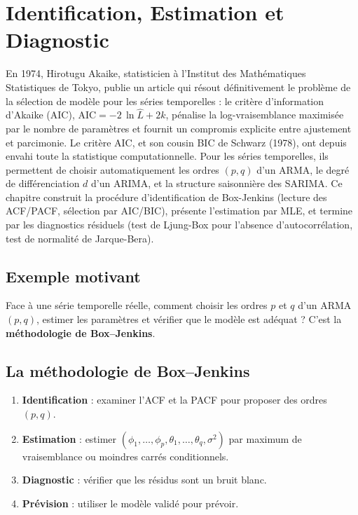 \chapter{Identification, Estimation et Diagnostic}
\label{ch:identification}

En 1974, Hirotugu Akaike, statisticien à l'Institut des Mathématiques Statistiques de Tokyo, publie un article qui résout définitivement le problème de la sélection de modèle pour les séries temporelles : le critère d'information d'Akaike (AIC), $\mathrm{AIC} = -2\,\ln\hat{L} + 2k$, pénalise la log-vraisemblance maximisée par le nombre de paramètres et fournit un compromis explicite entre ajustement et parcimonie. Le critère AIC, et son cousin BIC de Schwarz (1978), ont depuis envahi toute la statistique computationnelle. Pour les séries temporelles, ils permettent de choisir automatiquement les ordres $(p,q)$ d'un ARMA, le degré de différenciation $d$ d'un ARIMA, et la structure saisonnière des SARIMA. Ce chapitre construit la procédure d'identification de Box-Jenkins (lecture des ACF/PACF, sélection par AIC/BIC), présente l'estimation par MLE, et termine par les diagnostics résiduels (test de Ljung-Box pour l'absence d'autocorrélation, test de normalité de Jarque-Bera).

\section{Exemple motivant}
Face \`a une s\'erie temporelle r\'eelle, comment choisir les ordres $p$ et $q$ d'un ARMA$(p,q)$, estimer les param\`etres et v\'erifier que le mod\`ele est ad\'equat ? C'est la \textbf{m\'ethodologie de Box--Jenkins}.

\section{La m\'ethodologie de Box--Jenkins}

\begin{methode}
\begin{enumerate}
\item \textbf{Identification} : examiner l'ACF et la PACF pour proposer des ordres $(p,q)$.
\item \textbf{Estimation} : estimer $(\phi_1,\ldots,\phi_p,\theta_1,\ldots,\theta_q,\sigma^2)$ par maximum de vraisemblance ou moindres carr\'es conditionnels.
\item \textbf{Diagnostic} : v\'erifier que les r\'esidus sont un bruit blanc.
\item \textbf{Pr\'evision} : utiliser le mod\`ele valid\'e pour pr\'evoir.
\end{enumerate}
\end{methode}

